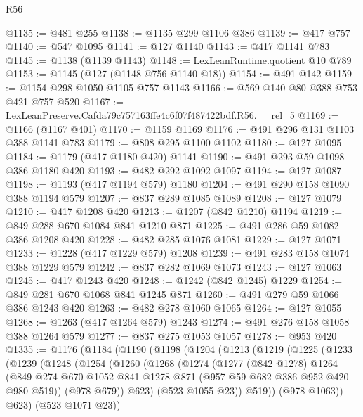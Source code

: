 \begin{lexlean}{R56}
\begin{coremodule}
@1135 := @481 @255
@1138 := @1135 @299 @1106 @386
@1139 := @417 @757
@1140 := @547 @1095
@1141 := @127 @1140
@1143 := @417 @1141 @783
@1145 := @1138 (@1139 @1143)
@1148 := LexLeanRuntime.quotient @10 @789
@1153 := @1145 (@127 (@1148 @756 @1140 @18))
@1154 := @491 @142
@1159 := @1154 @298 @1050 @1105 @757 @1143
@1166 := @569 @140 @80 @388 @753 @421 @757 @520
@1167 := LexLeanPreserve.Cafda79c757163ffe4c6f07f487422bdf.R56.__rel_5
@1169 := @1166 (@1167 @401)
@1170 := @1159 @1169
@1176 := @491 @296 @131 @1103 @388 @1141 @783
@1179 := @808 @295 @1100 @1102
@1180 := @127 @1095
@1184 := @1179 (@417 @1180 @420) @1141
@1190 := @491 @293 @59 @1098 @386 @1180 @420
@1193 := @482 @292 @1092 @1097
@1194 := @127 @1087
@1198 := @1193 (@417 @1194 @579) @1180
@1204 := @491 @290 @158 @1090 @388 @1194 @579
@1207 := @837 @289 @1085 @1089
@1208 := @127 @1079
@1210 := @417 @1208 @420
@1213 := @1207 (@842 @1210) @1194
@1219 := @849 @288 @670 @1084 @841 @1210 @871
@1225 := @491 @286 @59 @1082 @386 @1208 @420
@1228 := @482 @285 @1076 @1081
@1229 := @127 @1071
@1233 := @1228 (@417 @1229 @579) @1208
@1239 := @491 @283 @158 @1074 @388 @1229 @579
@1242 := @837 @282 @1069 @1073
@1243 := @127 @1063
@1245 := @417 @1243 @420
@1248 := @1242 (@842 @1245) @1229
@1254 := @849 @281 @670 @1068 @841 @1245 @871
@1260 := @491 @279 @59 @1066 @386 @1243 @420
@1263 := @482 @278 @1060 @1065
@1264 := @127 @1055
@1268 := @1263 (@417 @1264 @579) @1243
@1274 := @491 @276 @158 @1058 @388 @1264 @579
@1277 := @837 @275 @1053 @1057
@1278 := @953 @420
@1335 := @1176
    (@1184
      (@1190
        (@1198
          (@1204
            (@1213
              (@1219
                (@1225
                  (@1233
                    (@1239
                      (@1248
                        (@1254
                          (@1260
                            (@1268
                              (@1274
                                (@1277
                                  (@842 @1278)
                                  @1264
                                  (@849
                                    @274
                                    @670
                                    @1052
                                    @841
                                    @1278
                                    @871
                                    (@957 @59 @682 @386 @952 @420 @980 @519))
                                  (@978 @679))
                                @623)
                              (@523 @1055 @23))
                            @519))
                        (@978 @1063))
                      @623)
                    (@523 @1071 @23))

\end{coremodule}
\end{lexlean}
